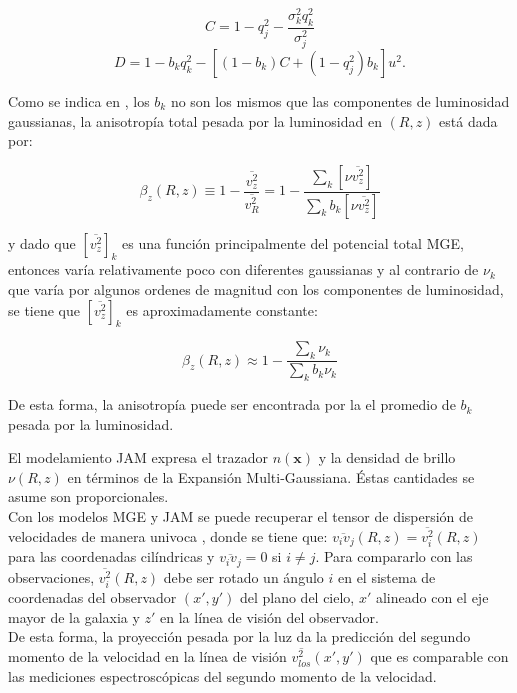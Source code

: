 $$ C=1-q_j^2 - \frac{\sigma_k^2 q_k^2 }{ \sigma_j^2 } $$
$$ D = 1-b_kq_k^2 - [(1-b_k)C + (1-q_j^2)b_k ] u^2. $$

Como se indica en \cite{2008MNRAS.390_71C}, los $b_k$ no son los mismos que las componentes de luminosidad gaussianas, la anisotropía total pesada por la luminosidad en $(R, z)$ está dada por:

\begin{equation}
\label{anisotropy_z}
\beta_z(R, z) \equiv 1-\frac{ \overline{v_z^2} }{ \overline{v_R^2} } = 1-\frac{ \sum_k \left[ \nu  \overline{v_z^2} \right]  }{ \sum_k b_k \left[ \nu  \overline{v_z^2} \right] }
\end{equation}

y dado que $[\overline{v_z^2}]_k$ es una función principalmente del potencial total MGE, entonces varía relativamente poco con diferentes gaussianas y al contrario de $\nu_k$ que varía por algunos ordenes de magnitud con los componentes de luminosidad, se tiene que $[\overline{v_z^2}]_k$ es aproximadamente constante:

\begin{equation}
\label{anisotropy_z_approx}
\beta_z(R, z) \approx 1-\frac{ \sum_k \nu_k }{ \sum_k b_k \nu_k }
\end{equation}

De esta forma, la anisotropía puede ser encontrada por la el promedio de $b_k$ pesada por la luminosidad.


El modelamiento JAM expresa el trazador $n(\textbf{x})$ y la densidad de brillo $\nu(R, z)$ en términos de la Expansión Multi-Gaussiana. Éstas cantidades se asume son proporcionales.\\

Con los modelos MGE y JAM se puede recuperar el tensor de dispersión de velocidades de manera univoca \cite{TR16}, donde se tiene que: $\overline{v_i v_j}(R,z) = \overline{v_i^2}(R, z)$ para las coordenadas cilíndricas y $\overline{v_i v_j} = 0$ si $i\neq j$. Para compararlo con las observaciones, $\overline{v_i^2}(R, z)$ debe ser rotado un ángulo $i$ en el sistema de coordenadas del observador $(x', y')$ del plano del cielo, $x'$ alineado con el eje mayor de la galaxia y $z'$ en la línea de visión del observador.\\

De esta forma, la proyección pesada por la luz da la predicción del segundo momento de la velocidad en la línea de visión $\overline{v_{los}^2}(x', y')$ que es comparable con las mediciones espectroscópicas del segundo momento de la velocidad.


